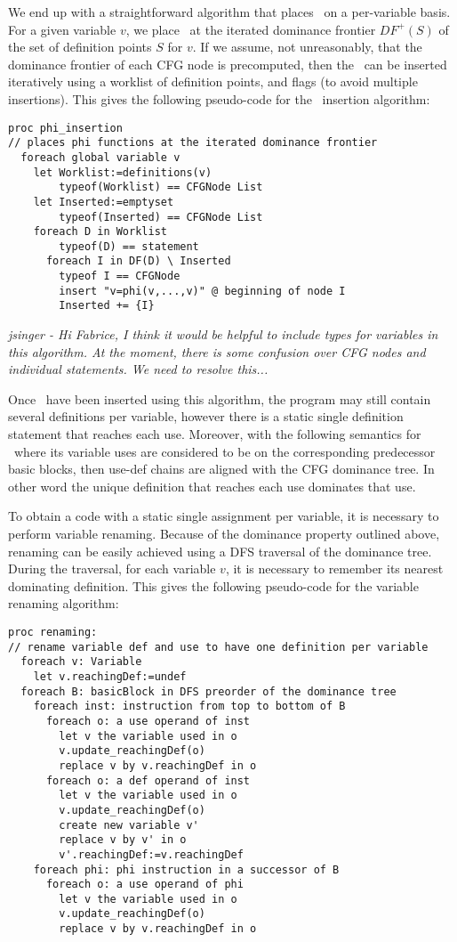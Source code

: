 We end up with a straightforward algorithm that places \phiops\ on a per-variable basis.
For a given variable $v$, we place \phiops\ at the iterated dominance frontier $DF^{+}(S)$ of the set of definition points $S$ for $v$. 
If we assume, not unreasonably, that the dominance frontier of each CFG node is precomputed, then the \phiops\ can be inserted iteratively using a worklist of definition points, and flags (to avoid multiple insertions). 
This gives the following pseudo-code for the \phiop\ insertion algorithm:
\begin{verbatim}
proc phi_insertion
// places phi functions at the iterated dominance frontier
  foreach global variable v
    let Worklist:=definitions(v)
        typeof(Worklist) == CFGNode List
    let Inserted:=emptyset
        typeof(Inserted) == CFGNode List
    foreach D in Worklist
        typeof(D) == statement
      foreach I in DF(D) \ Inserted
        typeof I == CFGNode
        insert "v=phi(v,...,v)" @ beginning of node I
        Inserted += {I}
\end{verbatim}
\emph{jsinger - Hi Fabrice, I think it would be helpful to include
types for variables in this algorithm. At the moment, there is some confusion
over CFG nodes and individual statements. We need to resolve this...}

Once \phiops\ have been inserted using this algorithm, the program may still contain several definitions per variable, however there is a static single definition statement that reaches each use. Moreover, with the following semantics for \phiops\ where its variable uses are considered to be on the corresponding predecessor basic blocks, then use-def chains are aligned with the CFG dominance tree. In other word the unique definition that reaches each use dominates that use.

To obtain a code with a static single assignment per variable, it is necessary to perform variable renaming. Because of the dominance property outlined above,
renaming can be easily achieved using a DFS traversal of the dominance tree.
During the traversal, for each variable $v$, it is necessary to remember its nearest dominating definition.
This gives the following pseudo-code for the variable renaming algorithm:
\begin{verbatim}
proc renaming:
// rename variable def and use to have one definition per variable
  foreach v: Variable
    let v.reachingDef:=undef
  foreach B: basicBlock in DFS preorder of the dominance tree
    foreach inst: instruction from top to bottom of B
      foreach o: a use operand of inst
        let v the variable used in o
        v.update_reachingDef(o)
        replace v by v.reachingDef in o
      foreach o: a def operand of inst
        let v the variable used in o
        v.update_reachingDef(o)
        create new variable v'
        replace v by v' in o
        v'.reachingDef:=v.reachingDef
    foreach phi: phi instruction in a successor of B
      foreach o: a use operand of phi
        let v the variable used in o
        v.update_reachingDef(o)
        replace v by v.reachingDef in o
\end{verbatim}

